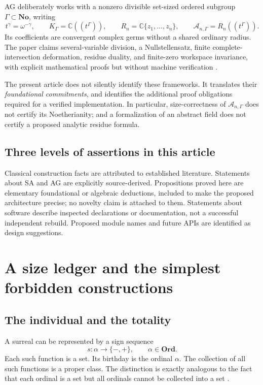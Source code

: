 \documentclass[11pt,letterpaper]{article}
\theoremstyle{definition}
\theoremstyle{remark}
\newcommand{\No}{\mathbf{No}}
\newcommand{\Ord}{\mathbf{Ord}}
\newcommand{\C}{\mathbb C}
\newcommand{\A}{\mathscr A}
\numberwithin{equation}{section}
\begin{document}
AG deliberately works with a nonzero divisible set-sized ordered subgroup \(\Gamma\subset\No\), writing
\begin{equation}\label{eq:workspaces}
 t^\gamma=\omega^{-\gamma},\qquad
 K_\Gamma=\C((t^\Gamma)),\qquad
 R_n=\C\{z_1,\ldots,z_n\},\qquad
 \A_{n,\Gamma}=R_n((t^\Gamma)).
\end{equation}
Its coefficients are convergent complex germs without a shared ordinary radius. The paper claims several-variable division, a Nullstellensatz, finite complete-intersection deformation, residue duality, and finite-zero workspace invariance, with explicit mathematical proofs but without machine verification \cite[\S\S2--10]{AG}.

The present article does not silently identify these frameworks. It translates their \emph{foundational commitments}, and identifies the additional proof obligations required for a verified implementation. In particular, size-correctness of \(\A_{n,\Gamma}\) does not certify its Noetherianity; and a formalization of an abstract field does not certify a proposed analytic residue formula.

\subsection{Three levels of assertions in this article}
Classical construction facts are attributed to established literature. Statements about SA and AG are explicitly source-derived. Propositions proved here are elementary foundational or algebraic deductions, included to make the proposed architecture precise; no novelty claim is attached to them. Statements about software describe inspected declarations or documentation, not a successful independent rebuild. Proposed module names and future APIs are identified as design suggestions.

\section{A size ledger and the simplest forbidden constructions}\label{sec:ledger}

\subsection{The individual and the totality}
A surreal can be represented by a sign sequence
\[
 s:\alpha\longrightarrow\{-,+\},\qquad \alpha\in\Ord.
\]
Each such function is a set. Its birthday is the ordinal \(\alpha\). The collection of all such functions is a proper class. The distinction is exactly analogous to the fact that each ordinal is a set but all ordinals cannot be collected into a set \cite{Gonshor,Conway}.
\end{document}
